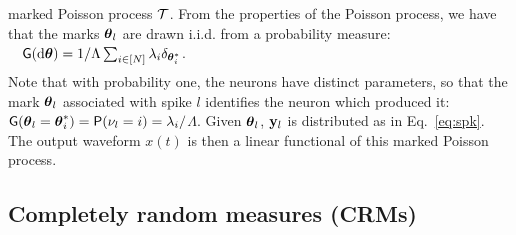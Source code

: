 marked Poisson process $\mathcal{T}$.  From the properties of the Poisson process, we have that the marks $\boldsymbol{\theta}_l$ are drawn i.i.d. from a probability measure:
$\quad  \mathsf{G}(\mathrm{d} \boldsymbol{\theta}) = 1/\Lambda\sum_{i \in [N]} \lambda_i \delta_{\boldsymbol{\theta}^*_i}$.
\vspace{-.27in}
\begin{align}
    \label{eq:mark_distr}
\end{align}
Note that with probability one, the neurons have distinct parameters, so that the mark $\boldsymbol{\theta}_l$ associated with spike $l$ identifies the
neuron which produced it: $\mathsf{G}(\boldsymbol{\theta}_l = \boldsymbol{\theta}^*_i) = \mathsf{P}(\nu_l= i) = \lambda_i/$$\Lambda$. Given $\boldsymbol{\theta}_l$, $\mathbf{y}_l$ is distributed as in
Eq.~\eqref{eq:spk}. The output waveform $x(t)$ is then a linear functional of this marked Poisson process. %

\subsection{Completely random measures (CRMs)}

